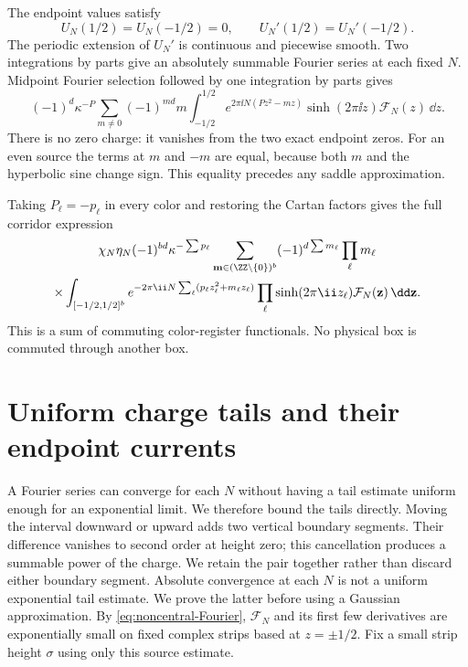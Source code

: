 The endpoint values satisfy
\[
 U_N(1/2)=U_N(-1/2)=0,\qquad
 U_N'(1/2)=U_N'(-1/2).
\]
The periodic extension of $U_N'$ is continuous and piecewise smooth. Two integrations by parts give an absolutely summable Fourier series at each fixed $N$. Midpoint Fourier selection followed by one integration by parts gives
\begin{equation}\label{eq:one-charge}
 (-1)^d\kappa^{-P}
 \sum_{m\ne0}(-1)^{md}m
 \int_{-1/2}^{1/2}e^{2\pi\ii N(Pz^2-mz)}
 \sinh(2\pi\ii z)\mathcal F_N(z)\,\dd z.
\end{equation}
There is no zero charge: it vanishes from the two exact endpoint zeros. For an even source the terms at $m$ and $-m$ are equal, because both $m$ and the hyperbolic sine change sign. This equality precedes any saddle approximation.

Taking $P_\ell=-p_\ell$ in every color and restoring the Cartan factors gives the full corridor expression
\begin{multline}\label{eq:full-charge}
 \chi_N\eta_N(-1)^{bd}\kappa^{-\sum p_\ell}
 \sum_{\mathbf m\in(\ZZ\setminus\{0\})^b}
 (-1)^{d\sum m_\ell}\prod_\ell m_\ell\\
 \times\int_{[-1/2,1/2]^b}
 e^{-2\pi\ii N\sum_\ell(p_\ell z_\ell^2+m_\ell z_\ell)}
 \prod_\ell\sinh(2\pi\ii z_\ell)\mathcal F_N(\mathbf z)\,\dd\mathbf z.
\end{multline}
This is a sum of commuting color-register functionals. No physical box is commuted through another box.

\section{Uniform charge tails and their endpoint currents}

A Fourier series can converge for each $N$ without having a tail estimate uniform enough for an exponential limit. We therefore bound the tails directly. Moving the interval downward or upward adds two vertical boundary segments. Their difference vanishes to second order at height zero; this cancellation produces a summable power of the charge. We retain the pair together rather than discard either boundary segment.
Absolute convergence at each $N$ is not a uniform exponential tail estimate. We prove the latter before using a Gaussian approximation. By \eqref{eq:noncentral-Fourier}, $\mathcal F_N$ and its first few derivatives are exponentially small on fixed complex strips based at $z=\pm1/2$. Fix a small strip height $\sigma$ using only this source estimate.

